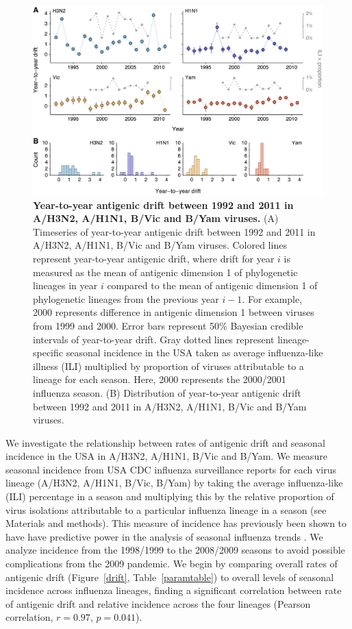 \documentclass[11pt,oneside,letterpaper]{article}
\begin{document}
\begin{figure}[h]
	\centering		
	\includegraphics[width=1.0\textwidth]{figures/jumps}
	\caption{\textbf{Year-to-year antigenic drift between 1992 and 2011 in A/H3N2, A/H1N1, B/Vic and B/Yam viruses.} 
	(A) Timeseries of year-to-year antigenic drift between 1992 and 2011 in A/H3N2, A/H1N1, B/Vic and B/Yam viruses.
	Colored lines represent year-to-year antigenic drift, where drift for year $i$ is measured as the mean of antigenic dimension 1 of phylogenetic lineages in year $i$ compared to the mean of antigenic dimension 1 of phylogenetic lineages from the previous year $i-1$.
	For example, 2000 represents difference in antigenic dimension 1 between viruses from 1999 and 2000.
	Error bars represent 50\% Bayesian credible intervals of year-to-year drift.
	Gray dotted lines represent lineage-specific seasonal incidence in the USA taken as average influenza-like illness (ILI) multiplied by proportion of viruses attributable to a lineage for each season.
	Here, 2000 represents the 2000/2001 influenza season.
	(B) Distribution of year-to-year antigenic drift between 1992 and 2011 in A/H3N2, A/H1N1, B/Vic and B/Yam viruses.
	} 
	\label{jumps} 
\end{figure}

We investigate the relationship between rates of antigenic drift and seasonal incidence in the USA in A/H3N2, A/H1N1, B/Vic and B/Yam.
We measure seasonal incidence from USA CDC influenza surveillance reports for each virus lineage (A/H3N2, A/H1N1, B/Vic, B/Yam) by taking the average influenza-like (ILI) percentage in a season and multiplying this by the relative proportion of virus isolations attributable to a particular influenza lineage in a season (see Materials and methods).
This measure of incidence has previously been shown to have have predictive power in the analysis of seasonal influenza trends \cite{Goldstein11}.
We analyze incidence from the 1998/1999 to the 2008/2009 seasons to avoid possible complications from the 2009 pandemic.
We begin by comparing overall rates of antigenic drift (Figure~\ref{drift}, Table~\ref{paramtable}) to overall levels of seasonal incidence across influenza lineages, finding a significant correlation between rate of antigenic drift and relative incidence across the four lineages (Pearson correlation, $r=0.97$, $p = 0.041$).
\end{document}
